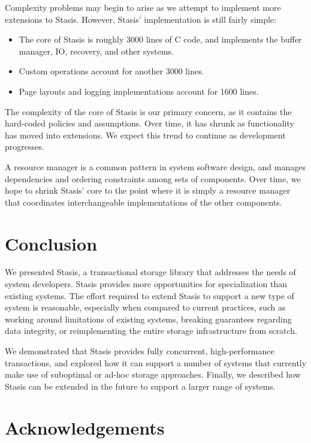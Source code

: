 \documentclass[letterpaper,twocolumn,10pt]{article}
\newcommand{\yad}{Stasis\xspace}
\newcommand{\yads}{Stasis'\xspace}
\begin{document}
Complexity problems may begin to arise as we attempt to implement more
extensions to \yad.  However, \yads implementation is still fairly simple:

\begin{itemize}
\item The core of \yad is roughly 3000 lines
of C code, and implements the buffer manager, IO, recovery, and other
systems.
\item Custom operations account for another 3000 lines.
\item Page layouts and logging implementations account for 1600 lines.
\end{itemize}

The complexity of the core of \yad is our primary concern, as it
contains the hard-coded policies and assumptions.  Over time, it has
shrunk as functionality has moved into extensions.  We expect
this trend to continue as development progresses.  

A resource manager is a common pattern in system software design, and
manages dependencies and ordering constraints among sets of
components.  Over time, we hope to shrink \yads core to the point
where it is simply a resource manager that coordinates interchangeable
implementations of the other components.

\section{Conclusion}

We presented \yad, a transactional storage library that addresses
the needs of system developers.  \yad provides more opportunities for
specialization than existing systems.  The effort required to extend
\yad to support a new type of system is reasonable, especially when
compared to current practices, such as working around
limitations of existing systems, breaking guarantees regarding data
integrity, or reimplementing the entire storage infrastructure from
scratch.

We demonstrated that \yad provides fully
concurrent, high-performance transactions, and explored how it can
support a number of systems that currently make use of suboptimal or
ad-hoc storage approaches.  Finally, we described how \yad can be
extended in the future to support a larger range of systems.



\section{Acknowledgements}
\end{document}
